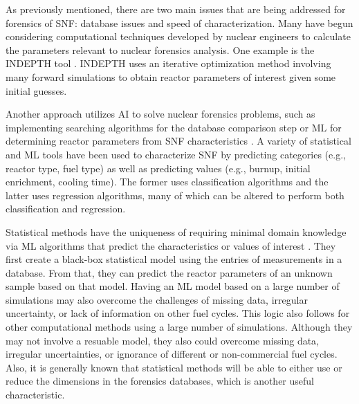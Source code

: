 As previously mentioned, there are two main issues that are being addressed for
forensics of \gls{SNF}: database issues and speed of characterization.  Many
have begun considering computational techniques developed by nuclear engineers
to calculate the parameters relevant to nuclear forensics analysis.  One
example is the \gls{INDEPTH} tool \cite{weber_2006, weber_2010, weber_2011}.
\gls{INDEPTH} uses an iterative optimization method involving many forward
simulations to obtain reactor parameters of interest given some initial
guesses. 

Another approach utilizes \gls{AI} to solve nuclear forensics problems, such as
implementing searching algorithms for the database comparison step
\cite{gey_search} or \gls{ML} for determining reactor parameters from \gls{SNF}
characteristics \cite{dayman_feasibility_2013, nicolaou_2006, nicolaou_2009,
nicolaou_2014, robel_2009, pu_discrimination, jones_viz_2014, jones_snf_2014}.
A variety of statistical and \gls{ML} tools have been used to characterize
\gls{SNF} by predicting categories (e.g., reactor type, fuel type) as well as
predicting values (e.g., burnup, initial enrichment, cooling time). The former
uses classification algorithms and the latter uses regression algorithms, many
of which can be altered to perform both classification and regression.  

Statistical methods have the uniqueness of requiring minimal domain knowledge
via \gls{ML} algorithms that predict the characteristics or values of interest
\cite{dayman_feasibility_2013, pu_discrimination, robel_2009, nicolaou_2006,
nicolaou_2009, nicolaou_2014, jones_snf_2014, jones_viz_2014}.  They first
create a black-box statistical model using the entries of measurements in a
database. From that, they can predict the reactor parameters of an unknown
sample based on that model.  Having an \gls{ML} model based on a large number
of simulations may also overcome the challenges of missing data, irregular
uncertainty, or lack of information on other fuel cycles.  This logic also
follows for other computational methods using a large number of simulations.
Although they may not involve a resuable model, they also could overcome
missing data, irregular uncertainties, or ignorance of different or
non-commercial fuel cycles.  Also, it is generally known that statistical
methods will be able to either use or reduce the dimensions in the forensics
databases, which is another useful characteristic.
